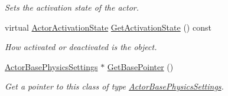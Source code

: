 \begin{DoxyCompactItemize}
\begin{DoxyCompactList}\small\item\em Sets the activation state of the actor. \item\end{DoxyCompactList}\item 
virtual \hyperlink{namespacephys_a7d434b1a52cf5290a9ecc972b87a6a40}{ActorActivationState} \hyperlink{classphys_1_1ActorBasePhysicsSettings_ad7d02ace01a30cb3ae9ab187d2449f38}{GetActivationState} () const 
\begin{DoxyCompactList}\small\item\em How activated or deactivated is the object. \item\end{DoxyCompactList}\item 
\hyperlink{classphys_1_1ActorBasePhysicsSettings}{ActorBasePhysicsSettings} $\ast$ \hyperlink{classphys_1_1ActorBasePhysicsSettings_a375c4b19c81e87021266c90e7327888b}{GetBasePointer} ()
\begin{DoxyCompactList}\small\item\em Get a pointer to this class of type \hyperlink{classphys_1_1ActorBasePhysicsSettings}{ActorBasePhysicsSettings}. \item\end{DoxyCompactList}\end{DoxyCompactItemize}
